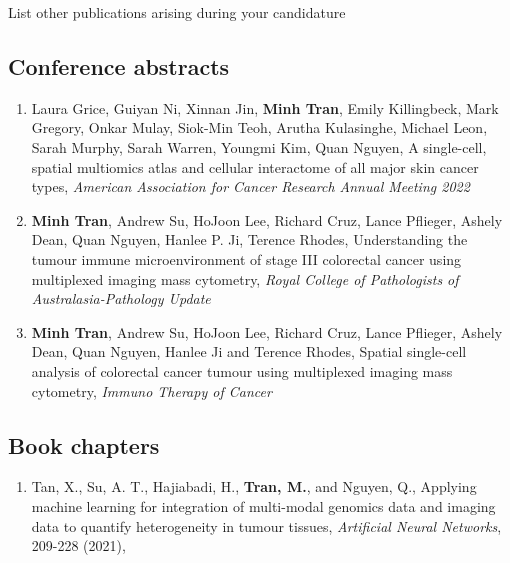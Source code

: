 \begin{instructional}
    List other publications arising during your candidature
    
    \subsection*{Conference abstracts}
    \begin{enumerate}

    \item Laura Grice, Guiyan Ni, Xinnan Jin, \textbf{Minh Tran}, Emily Killingbeck, Mark Gregory, Onkar Mulay, Siok-Min Teoh, Arutha Kulasinghe, Michael Leon, Sarah Murphy, Sarah Warren, Youngmi Kim, Quan Nguyen, A single-cell, spatial multiomics atlas and cellular interactome of all major skin cancer types, \textit{American Association for Cancer Research Annual Meeting 2022}
    
    \item \textbf{Minh Tran}, Andrew Su, HoJoon Lee, Richard Cruz, Lance Pflieger, Ashely Dean, Quan Nguyen, Hanlee P. Ji, Terence Rhodes, Understanding the tumour immune microenvironment of stage III colorectal cancer using multiplexed imaging mass cytometry, \textit{Royal College of Pathologists of Australasia-Pathology Update}
    
    \item \textbf{Minh Tran}, Andrew Su, HoJoon Lee, Richard Cruz, Lance Pflieger, Ashely Dean, Quan Nguyen, Hanlee Ji and Terence Rhodes, Spatial single-cell analysis of colorectal cancer tumour using multiplexed imaging mass cytometry, \textit{Immuno Therapy of Cancer}
    \end{enumerate}

    \subsection*{Book chapters} 

    \begin{enumerate}

    \item \cite{tan2021applying} Tan, X., Su, A. T., Hajiabadi, H., \textbf{Tran, M.}, and Nguyen, Q., Applying machine learning for integration of multi-modal genomics data and imaging data to quantify heterogeneity in tumour tissues, \textit{Artificial Neural Networks}, 209-228 (2021),


    \end{enumerate}

\end{instructional}

